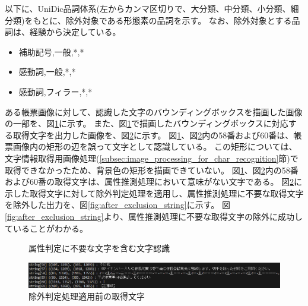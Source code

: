 以下に、UniDic品詞体系(左からカンマ区切りで、大分類、中分類、小分類、細分類)をもとに、除外対象である形態素の品詞を示す。
なお、除外対象とする品詞は、経験から決定している。

\begin{itemize}
    \item 補助記号,一般,*,*
    \item 感動詞,一般,*,*
    \item 感動詞,フィラー,*,*
\end{itemize}

ある帳票画像に対して、認識した文字のバウンディングボックスを描画した画像の一部を、図\ref{fig:before_exclusion_bbox}に示す。
また、図\ref{fig:before_exclusion_bbox}で描画したバウンディングボックスに対応する取得文字を出力した画像を、図\ref{fig:before_exclusion_string}に示す。
図\ref{fig:before_exclusion_bbox}、図\ref{fig:before_exclusion_string}内の58番および60番は、帳票画像内の矩形の辺を誤って文字として認識している。
この矩形については、文字情報取得用画像処理(\ref{subsec:image_processing_for_char_recognition}節)で取得できなかったため、背景色の矩形を描画できていない。
図\ref{fig:before_exclusion_bbox}、図\ref{fig:before_exclusion_string}内の58番および60番の取得文字は、属性推測処理において意味がない文字である。
図\ref{fig:before_exclusion_string}に示した取得文字に対して除外判定処理を適用し、属性推測処理に不要な取得文字を除外した出力を、図\ref{fig:after_exclusion_string}に示す。
図\ref{fig:after_exclusion_string}より、属性推測処理に不要な取得文字の除外に成功していることがわかる。

\begin{figure}[t]
    \begin{center}
        \caption{属性判定に不要な文字を含む文字認識}
        \label{fig:before_exclusion_bbox}
    \end{center}
\end{figure}

\begin{figure}[t]
    \begin{center}
        \includegraphics[width=15cm]{image/04-implementation/before_exclusion_string.png}
        \caption{除外判定処理適用前の取得文字}
        \label{fig:before_exclusion_string}
    \end{center}
\end{figure}

